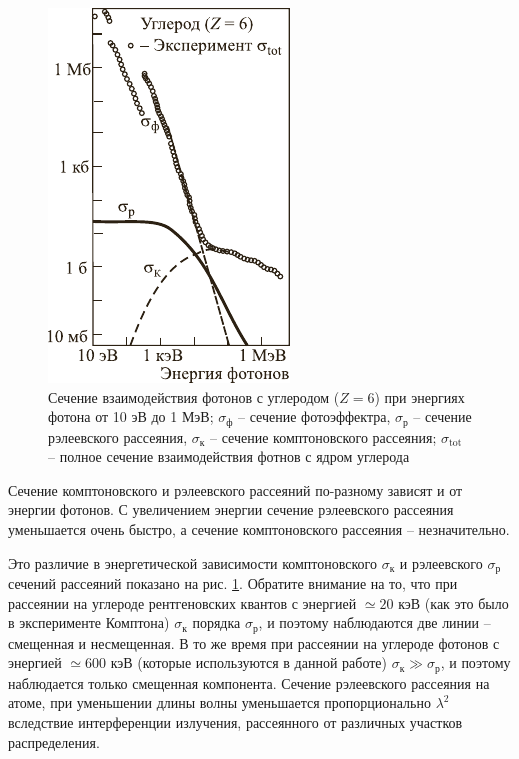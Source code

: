 \documentclass[a4paper,12pt]{article}
\begin{document}
\begin{figure}
	\begin{center}
		\includegraphics[scale=1.2]{pic2.pdf}
		\caption{Сечение взаимодействия фотонов с углеродом ($Z=6$) при энергиях фотона от 10 эВ до 1 МэВ; $\sigma_{\text{ф}}$ -- сечение фотоэффектра, $\sigma_{\text{р}}$ -- сечение рэлеевского рассеяния, $\sigma_{\text{к}}$ -- сечение комптоновского рассеяния; $\sigma_{\text{tot}}$ -- полное сечение взаимодействия фотнов с ядром углерода}
		\label{pic2}
	\end{center}	
\end{figure}
Сечение комптоновского и рэлеевского рассеяний по-разному зависят и от энергии фотонов. С увеличением энергии сечение рэлеевского рассеяния уменьшается очень быстро, а сечение комптоновского рассеяния -- незначительно.\par
Это различие в энергетической зависимости комптоновского $\sigma_{\text{к}}$ и рэлеевского $\sigma_{\text{р}}$ сечений рассеяний показано на рис. \ref{pic2}. Обратите внимание на то, что при рассеянии на углероде рентгеновских квантов с энергией $\simeq 20$ кэВ (как это было в эксперименте Комптона) $\sigma_{\text{к}}$ порядка $\sigma_{\text{р}}$, и поэтому наблюдаются две линии -- смещенная и несмещенная. В то же время при рассеянии на углероде фотонов с энергией $\simeq 600$ кэВ (которые используются в данной работе) $\sigma_{\text{к}} \gg \sigma_{\text{р}}$, и поэтому наблюдается только смещенная компонента. Сечение рэлеевского рассеяния на атоме, при уменьшении длины волны уменьшается пропорционально $\lambda^2$ вследствие интерференции излучения, рассеянного от различных участков распределения.
\end{document}
